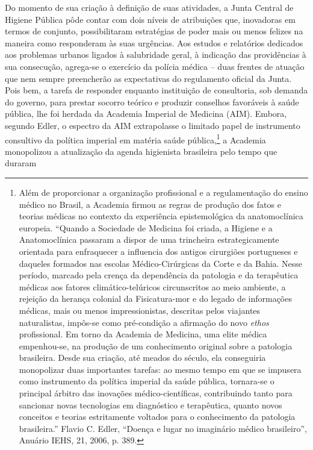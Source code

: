 Do momento de sua criação à definição de suas atividades, a Junta
Central de Higiene Pública pôde contar com dois níveis de atribuições
que, inovadoras em termos de conjunto, possibilitaram estratégias de
poder mais ou menos felizes na maneira como responderam às suas
urgências. Aos estudos e relatórios dedicados aos problemas urbanos
ligados à salubridade geral, à indicação das providências à sua
consecução, agrega-se o exercício da polícia médica -- duas frentes de
atuação que nem sempre preencherão as expectativas do regulamento
oficial da Junta. Pois bem, a tarefa de responder enquanto instituição
de consultoria, sob demanda do governo, para prestar socorro teórico e
produzir conselhos favoráveis à saúde pública, lhe foi herdada da
Academia Imperial de Medicina (AIM). Embora, segundo Edler, o espectro
da AIM extrapolasse o limitado papel de instrumento consultivo da
política imperial em matéria saúde pública,\footnote{Além de
  proporcionar a organização profissional e a regulamentação do ensino
  médico no Brasil, a Academia firmou as regras de produção dos fatos e
  teorias médicas no contexto da experiência epistemológica da
  anatomoclínica europeia. ``Quando a Sociedade de Medicina foi criada,
  a Higiene e a Anatomoclínica passaram a dispor de uma trincheira
  estrategicamente orientada para enfraquecer a influencia dos antigos
  cirurgiões portugueses e daqueles formados nas escolas
  Médico-Cirúrgicas da Corte e da Bahia. Nesse período, marcado pela
  crença da dependência da patologia e da terapêutica médicas aos
  fatores climático-telúricos circunscritos ao meio ambiente, a rejeição
  da herança colonial da Fisicatura-mor e do legado de informações
  médicas, mais ou menos impressionistas, descritas pelos viajantes
  naturalistas, impôs-se como pré-condição a afirmação do novo
  \emph{ethos} profissional. Em torno da Academia de Medicina, uma elite
  médica empenhou-se, na produção de um conhecimento original sobre a
  patologia brasileira. Desde sua criação, até meados do século, ela
  conseguiria monopolizar duas importantes tarefas: ao mesmo tempo em
  que se impusera como instrumento da política imperial da saúde
  pública, tornara-se o principal árbitro das inovações
  médico-científicas, contribuindo tanto para sancionar novas
  tecnologias em diagnóstico e terapêutica, quanto novos conceitos e
  teorias estritamente voltados para o conhecimento da patologia
  brasileira.'' Flavio C. Edler, ``Doença e lugar no imaginário médico
  brasileiro'', Anuário IEHS, 21, 2006, p. 389.} a Academia monopolizou
a atualização da agenda higienista brasileira pelo tempo que duraram
